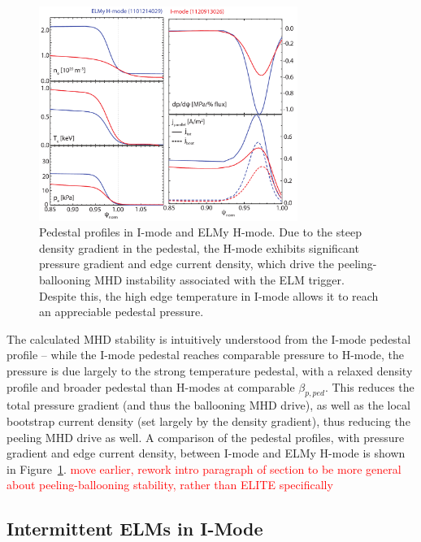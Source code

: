 \documentclass[12pt,floatfix,showpacs]{revtex4-1}
\newcommand{\note}[1]{\textcolor{red}{#1}}
\begin{document}
\begin{figure}[ht]
 \includegraphics[width=0.75\textwidth]{pdfgraphics/prof_elmy_imode.pdf}
 \caption{Pedestal profiles in I-mode and ELMy H-mode. Due to the steep density gradient in the pedestal, the H-mode exhibits significant pressure gradient and edge current density, which drive the peeling-ballooning MHD instability associated with the ELM trigger. Despite this, the high edge temperature in I-mode allows it to reach an appreciable pedestal pressure.}
 \label{fig:prof_elmy_imode}
\end{figure}

The calculated MHD stability is intuitively understood from the I-mode pedestal profile -- while the I-mode pedestal reaches comparable pressure to H-mode, the pressure is due largely to the strong temperature pedestal, with a relaxed density profile and broader pedestal than H-modes at comparable $\beta_{p,ped}$.  
This reduces the total pressure gradient (and thus the ballooning MHD drive), as well as the local bootstrap current density (set largely by the density gradient), thus reducing the peeling MHD drive as well.  A comparison of the pedestal profiles, with pressure gradient and edge current density, between I-mode and ELMy H-mode is shown in Figure~\ref{fig:prof_elmy_imode}.  
\note{move earlier, rework intro paragraph of section to be more general about peeling-ballooning stability, rather than ELITE specifically}

\subsection{Intermittent ELMs in I-Mode}\label{subsec:elms}
\end{document}
